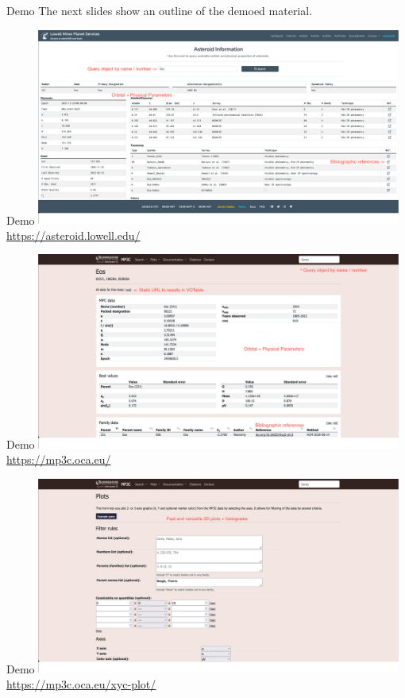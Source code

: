 \begin{frame}[t]{Demo}
  The next slides show an outline of the demoed material.
\end{frame}

\begin{frame}[t]{Demo}
  \includegraphics[width=0.9\textwidth]{gfx/demo_lowell.png}
  \url{https://asteroid.lowell.edu/}
\end{frame}

\begin{frame}[t]{Demo}
  \includegraphics[width=0.9\textwidth]{gfx/demo_mp3c.png}
  \url{https://mp3c.oca.eu/}
\end{frame}

\begin{frame}[t]{Demo}
  \includegraphics[width=0.9\textwidth]{gfx/demo_mp3c_2.png}
  \url{https://mp3c.oca.eu/xyc-plot/}
\end{frame}

